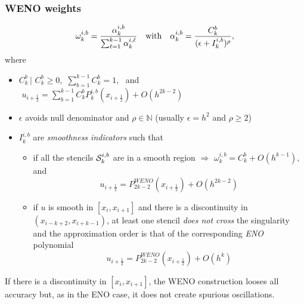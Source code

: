 \documentclass[xcolor=dvipsnames,9pt,mathserif]{beamer}
\newcommand\xunmezzo{x_{i+\frac12}}
\newcommand\uunmezzo{u_{i+\frac12}}
\newcommand\St{{\cal S}_k^{i,b}}
\newcommand\Po{P_k^{i,{b}}}
\newcommand{\coll}[1]{\emph{\color{red} #1}}
\begin{document}
  \begin{frame}
  \frametitle{WENO weights}

$$
\omega_k^{i,b}=\frac{\alpha_k^{i,b}}{\sum_{\ell=1}^{k-1} \alpha^{i,\ell}_k }
\quad
\hbox{with}
\quad
{\alpha_k^{i,b}=\frac{C_k^b}{(\epsilon +I_k^{i,b})^{\rho}},}
$$
where
\small{
\begin{itemize}
\item $C_k^b\, |$ $C_k^b\ge0,$   $\sum_{b=1}^{k-1} C_k^b=1,\,\,$  and $\,\,\uunmezzo =\sum_{b=1}^{k-1}C^b_k
 \Po(\xunmezzo)   + O(h^{2k-2})$
\item $\epsilon$  avoids null
  denominator and $\rho\in\mathbb{N}$ (usually   $\epsilon=h^2$  and $\rho\geq 2$)
\item $I_k^{i,b}$ are \coll{smoothness indicators}  such that
\begin{itemize}
\item if all the stencils $\St$ are in a smooth region $\Rightarrow$ $\omega^{i,b}_k=C^b_k+O(h^{k-1}),$ and
      $$\uunmezzo={P}^{WENO}_{2k-2}(\xunmezzo) +O(h^{2k-2})$$
\item if $u$ is smooth in $[x_i,x_{i+1}]$ and  there is a discontinuity in  {$(x_{i-k+2},x_{i+k-1})$}, at least one stencil  \coll{ does not cross } the singularity and the approximation order is that of the corresponding \coll{ENO} polynomial
    $$
\uunmezzo={P}^{WENO}_{2k-2}(\xunmezzo) +O(h^{k})$$
\end{itemize}
\end{itemize}
If there is a discontinuity in
$[x_i,x_{i+1}]$, the WENO construction looses all accuracy but, as in
the ENO case, it does
not create spurious oscillations.}
\end{frame}
\end{document}
